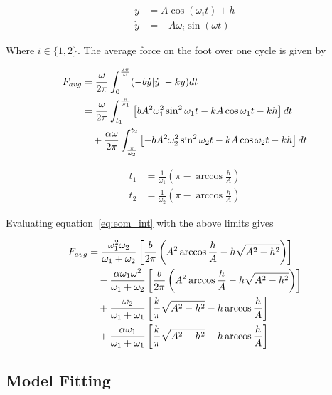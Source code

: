 \begin{align}
	y &= A \cos(\omega_i t) + h \\
	\dot{y} &= -A \omega_i \sin (\omega t)
\end{align}

\noindent Where $i \in \{1,2\}$. The average force on the foot over one cycle is given by 

\begin{align}
	F_{avg} &= \frac{\omega}{2 \pi} \int_0^{\frac{2 \pi}{\omega}} (-b \dot{y} | \dot{y} | - k y) dt \notag \\
			&= \frac{\omega}{2 \pi} \int_{t_1}^{\frac{\pi}{\omega_1}} \left[ b A^2 \omega_1^2 \sin^2 \omega_1 t - k A \cos \omega_1 t - kh  \right] dt \notag \\
			&\quad + \frac{\alpha \omega}{2 \pi}  \int_{\frac{\pi}{\omega_2}}^{t_2} \left[ -b A^2 \omega_2^2 \sin^2 \omega_2 t - k A \cos \omega_2 t - kh \right] dt \label{eq:eom_int}
\end{align}


\begin{align}
	t_1 &= \frac{1}{\omega_1} \left( \pi - \arccos \frac{h}{A} \right) \\
	t_2 &= \frac{1}{\omega_2} \left( \pi - \arccos \frac{h}{A} \right)
\end{align}

\noindent Evaluating equation~\ref{eq:eom_int} with the above limits gives

\begin{align}
    F_{avg} &= \frac{\omega_1^2 \omega_2}{\omega_1 + \omega_2} 
                \left[ \frac{b}{2 \pi} \left( A^2 \arccos \frac{h}{A} - h \sqrt{A^2 - h^2} \right) \right] \notag \\ 
            &\quad - \frac{\alpha \omega_1 \omega^2}{\omega_1 + \omega_2} 
                \left[ \frac{b}{2 \pi} \left( A^2 \arccos \frac{h}{A} - h \sqrt{A^2 - h^2} \right) \right] \notag \\
            &\quad + \frac{\omega_2}{\omega_1 + \omega_1} 
                \left[ \frac{k}{\pi} \sqrt{A^2 - h^2} - h \arccos \frac{h}{A} \right] \notag \\
            &\quad + \frac{\alpha \omega_1}{\omega_1 + \omega_1} 
                \left[ \frac{k}{\pi} \sqrt{A^2 - h^2} - h \arccos \frac{h}{A} \right] \label{eq:eom_avg}
\end{align}

\subsection{Model Fitting}

